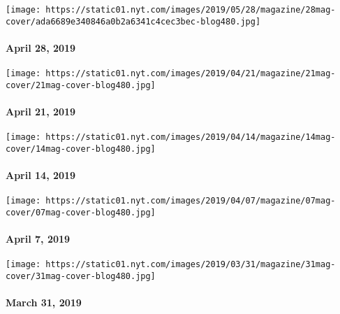 \href{https://www.nytimes.com/issue/magazine/2019/05/17/the-42819-issue}{}

\texttt{[image: https://static01.nyt.com/images/2019/05/28/magazine/28mag-cover/ada6689e340846a0b2a6341c4cec3bec-blog480.jpg]}

\hypertarget{april-28-2019}{%
\paragraph{April 28, 2019}\label{april-28-2019}}

\href{https://www.nytimes.com/issue/magazine/2019/04/23/the-42119-issue}{}

\texttt{[image: https://static01.nyt.com/images/2019/04/21/magazine/21mag-cover/21mag-cover-blog480.jpg]}

\hypertarget{april-21-2019}{%
\paragraph{April 21, 2019}\label{april-21-2019}}

\href{https://www.nytimes.com/issue/magazine/2019/04/12/the-41419-issue}{}

\texttt{[image: https://static01.nyt.com/images/2019/04/14/magazine/14mag-cover/14mag-cover-blog480.jpg]}

\hypertarget{april-14-2019}{%
\paragraph{April 14, 2019}\label{april-14-2019}}

\href{https://www.nytimes.com/issue/magazine/2019/04/06/the-4719-issue}{}

\texttt{[image: https://static01.nyt.com/images/2019/04/07/magazine/07mag-cover/07mag-cover-blog480.jpg]}

\hypertarget{april-7-2019}{%
\paragraph{April 7, 2019}\label{april-7-2019}}

\href{https://www.nytimes.com/issue/magazine/2019/03/29/the-33119-issue}{}

\texttt{[image: https://static01.nyt.com/images/2019/03/31/magazine/31mag-cover/31mag-cover-blog480.jpg]}

\hypertarget{march-31-2019}{%
\paragraph{March 31, 2019}\label{march-31-2019}}

